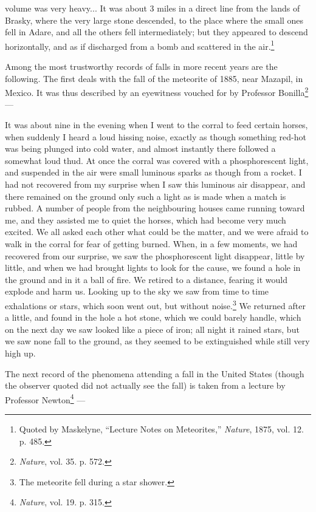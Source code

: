 \documentclass[a4paper, 12pt, oneside, polutonikogreek, english]{article}
\begin{document}
volume was very heavy... It was about 3 miles in a direct line from the lands of Brasky, where the very large stone descended, to the place where the small ones fell in Adare, and all the others fell intermediately; but they appeared to descend horizontally, and as if discharged from a bomb and scattered in the air.\footnote{Quoted by Maskelyne, ``Lecture Notes on Meteorites,'' \emph{Nature}, 1875, vol. 12. p. 485.}

Among the most trustworthy records of falls in more recent years are the following. The first deals with the fall of the meteorite of 1885, near Mazapil, in Mexico. It was thus described by an eyewitness vouched for by Professor Bonilla\footnote{\emph{Nature}, vol. 35. p. 572.} ---

It was about nine in the evening when I went to the corral to feed certain horses, when suddenly I heard a loud hissing noise, exactly as though something red-hot was being plunged into cold water, and almost instantly there followed a somewhat loud thud. At once the corral was covered with a phosphorescent light, and suspended in the air were small luminous sparks as though from a rocket. I had not recovered from my surprise when I saw this luminous air disappear, and there remained on the ground only such a light as is made when a match is rubbed. A number of people from the neighbouring houses came running toward me, and they assisted me to quiet the horses, which had become very much excited. We all asked each other what could be the matter, and we were afraid to walk in the corral for fear of getting burned. When, in a few moments, we had recovered from our surprise, we saw the phosphorescent light disappear, little by little, and when we had brought lights to look for the cause, we found a hole in the ground and in it a ball of fire. We retired to a distance, fearing it would explode and harm us. Looking up to the sky we saw from time to time exhalations or stars, which soon went out, but without noise.\footnote{The meteorite fell during a star shower.} We returned after a little, and found in the hole a hot stone, which we could barely handle, which on the next day we saw looked like a piece of iron; all night it rained stars, but we saw none fall to the ground, as they seemed to be extinguished while still very high up.

The next record of the phenomena attending a fall in the United States (though the observer quoted did not actually see the fall) is taken from a lecture by Professor Newton\footnote{\emph{Nature}, vol. 19. p. 315.} ---
\end{document}
